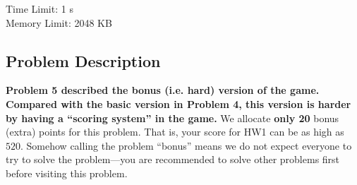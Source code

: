 \providecommand{\tightlist}{\setlength{\itemsep}{0pt}\setlength{\parskip}{0pt}}
\setcounter{secnumdepth}{0}

Time Limit: 1 s \\
Memory Limit: 2048 KB
\vspace{-15pt}

\subsection{Problem Description}\label{problem-description}

\textbf{Problem 5 described the bonus (i.e. hard) version of the game. Compared with the basic version in Problem 4, this version is harder by having a ``scoring system'' in the game.} We allocate \textbf{only 20} bonus (extra) points for this problem. That is, your score for HW1 can be as high as $520$. Somehow calling the problem ``bonus'' means we do not expect everyone to try to solve the problem---you are recommended to solve other problems first before visiting this problem.

\vspace{6pt}




